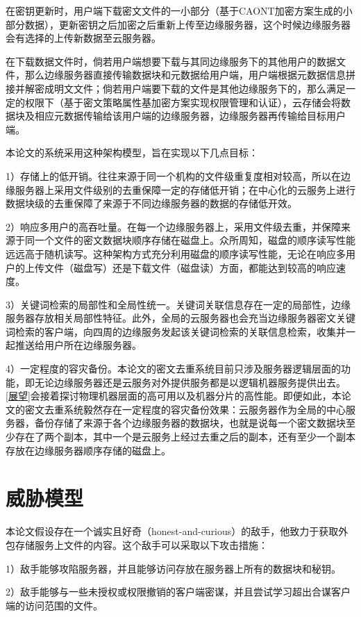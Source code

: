 \documentclass[promaster]{thesis-uestc}
\begin{document}
在密钥更新时，用户端下载密文文件的一小部分（基于CAONT加密方案生成的小部分数据），更新密钥之后加密之后重新上传至边缘服务器，这个时候边缘服务器会有选择的上传新数据至云服务器。

在下载数据文件时，倘若用户端想要下载与其同边缘服务下的其他用户的数据文件，那么边缘服务器直接传输数据块和元数据给用户端，用户端根据元数据信息拼接并解密成明文文件；倘若用户端要下载的文件是其他边缘服务下的，那么满足一定的权限下（基于密文策略属性基加密方案实现权限管理和认证），云存储会将数据块及相应元数据传输给该用户端的边缘服务器，边缘服务器再传输给目标用户端。

本论文的系统采用这种架构模型，旨在实现以下几点目标：

1）存储上的低开销。往往来源于同一个机构的文件级重复度相对较高，所以在边缘服务器上采用文件级别的去重保障一定的存储低开销；在中心化的云服务上进行数据块级的去重保障了来源于不同边缘服务器的数据的存储低开效。

2）响应多用户的高吞吐量。在每一个边缘服务器上，采用文件级去重，并保障来源于同一个文件的密文数据块顺序存储在磁盘上。众所周知，磁盘的顺序读写性能远远高于随机读写。这种架构方式充分利用磁盘的顺序读写性能，无论在响应多用户的上传文件（磁盘写）还是下载文件（磁盘读）方面，都能达到较高的响应速度。

3）关键词检索的局部性和全局性统一。关键词关联信息存在一定的局部性，边缘服务器存放相关局部性特征。此外，全局的云服务器也会充当边缘服务器密文关键词检索的客户端，向四周的边缘服务发起该关键词检索的关联信息检索，收集并一起推送给用户所在边缘服务器。

4）一定程度的容灾备份。本论文的密文去重系统目前只涉及服务器逻辑层面的功能，即无论边缘服务器还是云服务对外提供服务都是以逻辑机器服务提供出去。\ref{展望}会接着探讨物理机器层面的高可用以及机器分片的高性能。即便如此，本论文的密文去重系统毅然存在一定程度的容灾备份效果：云服务器作为全局的中心服务器，备份存储了来源于各个边缘服务器的数据块，也就是说每一个密文数据块至少存在了两个副本，其中一个是云服务上经过去重之后的副本，还有至少一个副本存放在边缘服务器顺序存储的磁盘上。
\section{威胁模型}
本论文假设存在一个诚实且好奇（honest-and-curious）的敌手，他致力于获取外包存储服务上文件的内容。这个敌手可以采取以下攻击措施：

1）敌手能够攻陷服务器，并且能够访问存放在服务器上所有的数据块和秘钥。

2）敌手能够与一些未授权或权限撤销的客户端密谋，并且尝试学习超出合谋客户端的访问范围的文件。
\end{document}
